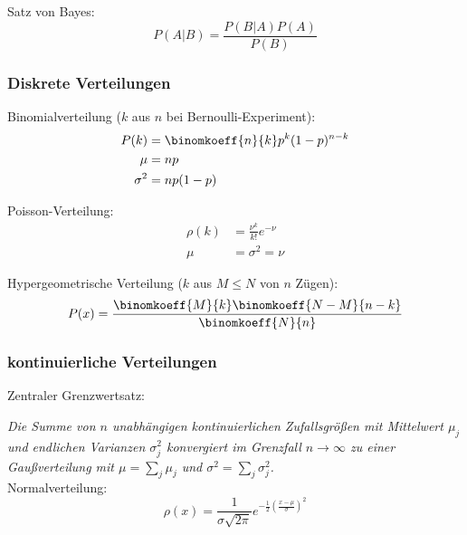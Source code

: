 \documentclass[11pt]{article}
\numberwithin{equation}{section}
\begin{document}
        Satz von Bayes:
        \begin{equation}
          P(A|B) = \frac{P(B|A)P(A)}{P(B)}
        \end{equation}

      \subsubsection{Diskrete Verteilungen}
        Binomialverteilung ($k$ aus $n$ bei Bernoulli-Experiment):
        \begin{equation}
          \begin{aligned}
            P(k)&=\binomkoeff{n}{k}p^k(1-p)^{n-k} \\
            \mu &= np \\
            \sigma^2 &= np(1-p)
          \end{aligned}
        \end{equation}

        Poisson-Verteilung:
        \begin{equation}
          \begin{aligned}
            \rho(k) &= \frac{\nu^k}{k!} e^{-\nu} \\
            \mu &= \sigma^2 = \nu
          \end{aligned}
        \end{equation}

        Hypergeometrische Verteilung ($k$ aus $M\le N$ von $n$ Zügen):
        \begin{equation}
          P(x)=\frac{\binomkoeff{M}{k}\binomkoeff{N-M}{n-k}}{\binomkoeff{N}{n}}
        \end{equation}

      \subsubsection{kontinuierliche Verteilungen}
        Zentraler Grenzwertsatz: \par
        \emph{Die Summe von $n$ unabhängigen kontinuierlichen Zufallsgrößen mit Mittelwert $\mu_j$ und endlichen Varianzen $\sigma_j^2$ konvergiert im Grenzfall $n\rightarrow \infty$ zu einer Gaußverteilung mit $\mu = \sum_j \mu_j$ und $\sigma^2 = \sum_j \sigma_j^2$.} \\

        Normalverteilung:
  			\begin{equation}
  				\rho(x)=\frac{1}{\sigma\sqrt{2\pi}}e^{-\frac{1}{2}\left(\frac{x-\mu}{\sigma}\right)^2}
  			\end{equation}
\end{document}

